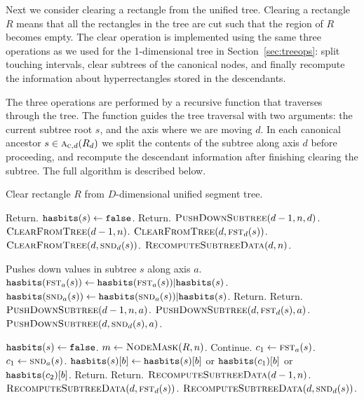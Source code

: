 \documentclass[english,gradu]{tktltiki2018}
\begin{document}
Next we consider clearing a rectangle from the unified tree.
Clearing a rectangle $R$ means that all the rectangles in the tree are cut such that the region of $R$ becomes empty.
The clear operation is implemented using the same three operations as we used for the 1-dimensional tree in Section~\ref{sec:treeops}:
split touching intervals, clear subtrees of the canonical nodes, and finally recompute the information about hyperrectangles stored in the descendants.

The three operations are performed by a recursive function \cleardt that traverses through the tree.
The function guides the tree traversal with two arguments: the current subtree root $s$, and the axis where we are moving $d$.
In each canonical ancestor $s\in\canonpari{R_d}{d}$ we split the contents of the subtree along axis $d$ before proceeding, and recompute the descendant information after finishing clearing the subtree.
The full algorithm is described below.

\begin{alg}\label{alg:segurm}
Clear rectangle $R$ from $D$-dimensional unified segment tree.
\begin{algorithmic}
		\State Return.
	\EndIf
		\State $\hasbita{s}\gets\texttt{false}$.
		\State Return.
	\EndIf
		\State $\pdst(d-1,n,d)$.
	\EndIf
	\State $\cleardt(d-1,n)$.
		\State $\cleardt(d,\leftu{s}{d})$.
		\State $\cleardt(d,\rightu{s}{d})$.
	\EndIf
		\State $\recomp(d,n)$.
	\EndIf
\EndProcedure

	\Comment Pushes down values in subtree $s$ along axis $a$.
		\State $\hasbita{\leftu{s}{a}}\gets \hasbita{\leftu{s}{a}} | \hasbita{s}$.
		\State $\hasbita{\rightu{s}{a}}\gets \hasbita{\rightu{s}{a}} | \hasbita{s}$.
		\State Return.
		\State Return.
	\EndIf
	\State $\pdst(d-1,n,a)$.
		\State $\pdst(d,\leftu{s}{d},a)$.
		\State $\pdst(d,\rightu{s}{d},a)$.
	\EndIf
\EndProcedure

		\State $\hasbita{s}\gets\texttt{false}$.
		\State $m\gets\maskof{R,n}$.
				Continue.
			\EndIf
			\State $c_1\gets\leftu{s}{a}$.
			\State $c_1\gets\rightu{s}{a}$.
					\State $\hasbits{s}{b}\gets \hasbits{s}{b}$ or $\hasbits{c_1}{b}$ or $\hasbits{c_2}{b}$.
				\EndIf
			\EndFor
		\EndFor
		\State Return.
		\State Return.
	\EndIf
	\State $\recomp(d-1,n)$.
		\State $\recomp(d,\leftu{s}{d})$.
		\State $\recomp(d,\rightu{s}{d})$.
	\EndIf
\EndProcedure
\end{algorithmic}
\end{alg}
\end{document}
